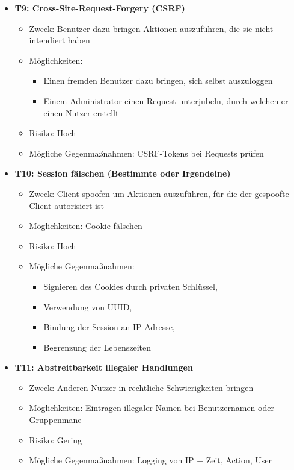 \documentclass[12pt,DIV14,BCOR10mm,a4paper,parskip=half-,headsepline,headinclude,english,ngerman,bibliography=totocnumbered]{scrreprt}
\begin{document}
\begin{itemize}
  \hypertarget{threat9}{}
  \item \textbf{T9: Cross-Site-Request-Forgery (CSRF)}
  \begin{itemize}
  \item Zweck: Benutzer dazu bringen Aktionen auszuführen, die sie nicht intendiert haben
  \item Möglichkeiten:
  \begin{itemize}
          \item Einen fremden Benutzer dazu bringen, sich selbst auszuloggen
          \item Einem Administrator einen Request unterjubeln, durch welchen er einen Nutzer erstellt
  \end{itemize}
  \item Risiko: Hoch
  \item Mögliche Gegenmaßnahmen: CSRF-Tokens bei Requests prüfen
  \end{itemize}

  \hypertarget{threat10}{}
  \item \textbf{T10: Session fälschen (Bestimmte oder Irgendeine)}
  \begin{itemize}
  \item Zweck: Client spoofen um Aktionen auszuführen, für die der gespoofte Client autorisiert ist
  \item Möglichkeiten: Cookie fälschen
  \item Risiko: Hoch
  \item Mögliche Gegenmaßnahmen:
  \begin{itemize}
    \item Signieren des Cookies durch privaten Schlüssel,
    \item Verwendung von UUID,
    \item Bindung der Session an IP-Adresse,
    \item Begrenzung der Lebenszeiten
  \end{itemize}
  \end{itemize}

  \hypertarget{threat11}{}
  \item \textbf{T11: Abstreitbarkeit illegaler Handlungen}
  \begin{itemize}
  \item Zweck: Anderen Nutzer in rechtliche Schwierigkeiten bringen
  \item Möglichkeiten: Eintragen illegaler Namen bei Benutzernamen oder Gruppenmane
  \item Risiko: Gering
  \item Mögliche Gegenmaßnahmen: Logging von IP + Zeit, Action, User
  \end{itemize}


\end{itemize}
\end{document}
